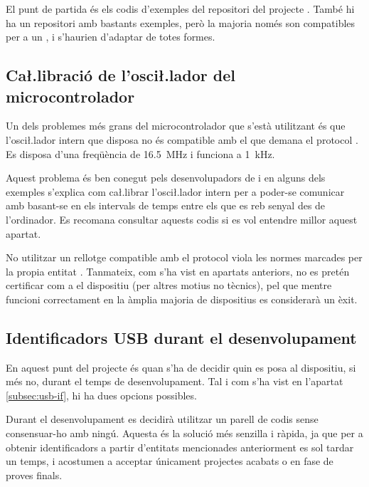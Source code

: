 El punt de partida és els codis d'exemples del repositori del projecte
\cite{VusbProjects}.
També hi ha un repositori amb bastants exemples, però la majoria només son
compatibles per a un , i s'haurien d'adaptar de totes formes.

\subsection{Ca\l.libració de l'osci\l.lador del microcontrolador}

Un dels problemes més grans del microcontrolador que s'està utilitzant és que
l'osci\l.lador intern que disposa no és compatible amb el que demana el
protocol . Es disposa d'una freqüència de
\SI[round-mode=places,round-precision=1]{16.5}{\mega\hertz} i
 funciona a
\SI[round-mode=places,round-precision=0]{1}{\kilo\hertz}.

Aquest problema és ben conegut pels desenvolupadors de  i en alguns
dels exemples s'explica com ca\l.librar l'osci\l.lador intern per a poder-se
comunicar amb  basant-se en els intervals de temps entre els que es
reb senyal des de l'ordinador. Es recomana consultar aquests codis
\cite{Vusb} si es vol entendre millor aquest apartat.

No utilitzar un rellotge compatible amb el protocol  viola les normes
marcades per la propia entitat . Tanmateix, com s'ha vist en
apartats anteriors, no es pretén certificar com a  el dispositiu
(per altres motius no tècnics), pel que mentre funcioni correctament en la
àmplia majoria de dispositius es considerarà un èxit.

\subsection{Identificadors USB durant el desenvolupament}

En aquest punt del projecte és quan s'ha de decidir
quin  es posa al dispositiu, si més no, durant el temps de
desenvolupament. Tal i com s'ha vist en l'apartat \ref{subsec:usb-if}, hi ha dues
opcions possibles.

Durant el desenvolupament es decidirà utilitzar un parell de codis sense
consensuar-ho amb ningú. Aquesta és la solució més senzilla i ràpida, ja que per
a obtenir identificadors a partir d'entitats mencionades anteriorment es sol
tardar un temps, i acostumen a acceptar únicament projectes acabats o en fase
de proves finals.


